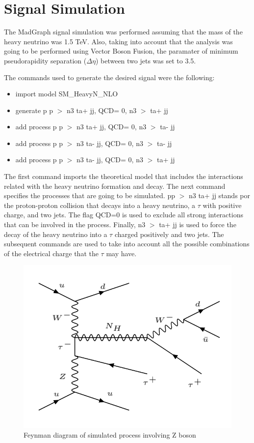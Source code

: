 \chapter{Signal Simulation} \label{sec: mgsim}

The MadGraph signal simulation was performed assuming that the mass of the heavy neutrino was 1.5 TeV. Also, taking into account that the analysis was going to be performed using Vector Boson Fusion, the paramater of minimum pseudorapidity separation ($\Delta \eta$) between two jets was set to 3.5.

The commands used to generate the desired signal were the following:

\begin{itemize}
\item import model SM\_HeavyN\_NLO
\item generate p p $>$ n3 ta+ jj, QCD= 0, n3 $>$ ta+ jj
\item add process p p $>$ n3 ta+ jj, QCD= 0, n3 $>$ ta- jj
\item add process p p $>$ n3 ta- jj, QCD= 0, n3 $>$ ta- jj
\item add process p p $>$ n3 ta- jj, QCD= 0, n3 $>$ ta+ jj

\end{itemize}

The first command imports the theoretical model that includes the interactions related with the heavy neutrino formation and decay. The next command specifies the processes that are going to be simulated. pp $>$ n3 ta+ jj stands por the proton-proton collision that decays into a heavy neutrino, a $\tau$ with positive charge, and two jets. The flag QCD=0 is used to exclude all strong interactions that can be involved in the process. Finally, n3 $>$ ta+ jj is used to force the decay of the heavy neutrino into a $\tau$ charged positively and two jets. The subsequent commands are used to take into account all the possible combinations of the electrical charge that the $\tau$ may have.

\begin{figure}[H]
\centering
\includegraphics[scale = 0.45]{Figures/Feynman_hnZ}
\caption{Feynman diagram of simulated process involving Z boson}
\label{fig: hnZ}
\end{figure}

